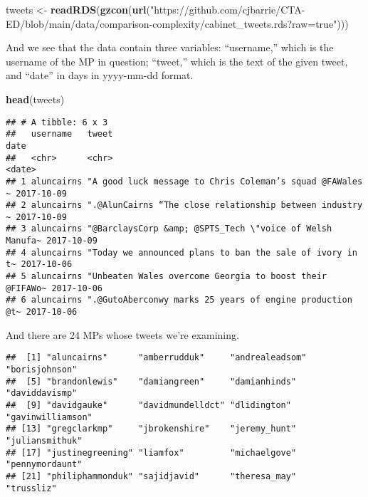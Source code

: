 \documentclass[
]{article}
\newenvironment{Shaded}{\begin{snugshade}}{\end{snugshade}}
\newcommand{\FunctionTok}[1]{\textcolor[rgb]{0.13,0.29,0.53}{\textbf{#1}}}
\newcommand{\NormalTok}[1]{#1}
\newcommand{\OtherTok}[1]{\textcolor[rgb]{0.56,0.35,0.01}{#1}}
\newcommand{\SpecialCharTok}[1]{\textcolor[rgb]{0.81,0.36,0.00}{\textbf{#1}}}
\newcommand{\StringTok}[1]{\textcolor[rgb]{0.31,0.60,0.02}{#1}}
\begin{document}
\begin{Shaded}
\begin{Highlighting}[]
\NormalTok{tweets  }\OtherTok{\textless{}{-}} \FunctionTok{readRDS}\NormalTok{(}\FunctionTok{gzcon}\NormalTok{(}\FunctionTok{url}\NormalTok{(}\StringTok{"https://github.com/cjbarrie/CTA{-}ED/blob/main/data/comparison{-}complexity/cabinet\_tweets.rds?raw=true"}\NormalTok{)))}
\end{Highlighting}
\end{Shaded}

And we see that the data contain three variables: ``username,'' which is
the username of the MP in question; ``tweet,'' which is the text of the
given tweet, and ``date'' in days in yyyy-mm-dd format.

\begin{Shaded}
\begin{Highlighting}[]
\FunctionTok{head}\NormalTok{(tweets)}
\end{Highlighting}
\end{Shaded}

\begin{verbatim}
## # A tibble: 6 x 3
##   username   tweet                                                    date      
##   <chr>      <chr>                                                    <date>    
## 1 aluncairns "A good luck message to Chris Coleman’s squad @FAWales ~ 2017-10-09
## 2 aluncairns ".@AlunCairns “The close relationship between industry ~ 2017-10-09
## 3 aluncairns "@BarclaysCorp &amp; @SPTS_Tech \"voice of Welsh Manufa~ 2017-10-09
## 4 aluncairns "Today we announced plans to ban the sale of ivory in t~ 2017-10-06
## 5 aluncairns "Unbeaten Wales overcome Georgia to boost their @FIFAWo~ 2017-10-06
## 6 aluncairns ".@GutoAberconwy marks 25 years of engine production @t~ 2017-10-06
\end{verbatim}

And there are 24 MPs whose tweets we're examining.

\begin{Shaded}
\end{Shaded}

\begin{verbatim}
##  [1] "aluncairns"      "amberrudduk"     "andrealeadsom"   "borisjohnson"   
##  [5] "brandonlewis"    "damiangreen"     "damianhinds"     "daviddavismp"   
##  [9] "davidgauke"      "davidmundelldct" "dlidington"      "gavinwilliamson"
## [13] "gregclarkmp"     "jbrokenshire"    "jeremy_hunt"     "juliansmithuk"  
## [17] "justinegreening" "liamfox"         "michaelgove"     "pennymordaunt"  
## [21] "philiphammonduk" "sajidjavid"      "theresa_may"     "trussliz"
\end{verbatim}
\end{document}
